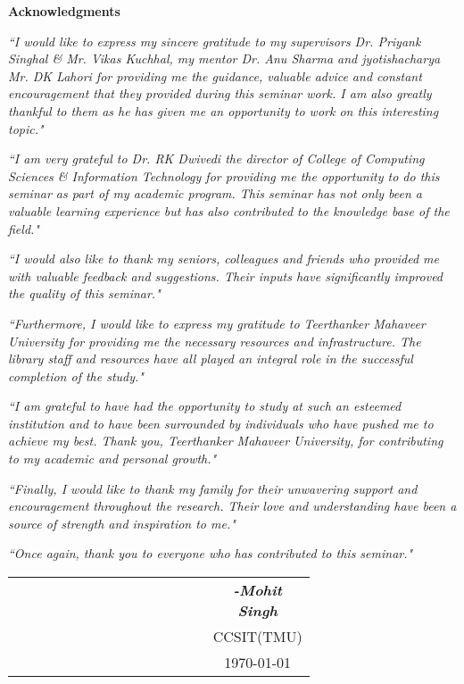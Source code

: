 \begin{center}
	\LARGE \textbf{Acknowledgments}
	\vspace{1\baselineskip}
\end{center}

\textit{``I would like to express my sincere gratitude to my supervisors Dr. Priyank Singhal \& Mr. Vikas Kuchhal, my mentor Dr. Anu Sharma and jyotishacharya Mr. DK Lahori for providing me the guidance, valuable advice and constant encouragement that they provided during this seminar work. I am also greatly thankful to them as he has given me an opportunity to work on this interesting topic."}

\textit{``I am very grateful to Dr. RK Dwivedi the director of College of Computing Sciences \& Information Technology for providing me the opportunity to do this seminar as part of my academic program. This seminar has not only been a valuable learning experience but has also contributed to the knowledge base of the field."}

\textit{``I would also like to thank my seniors, colleagues and friends who provided me with valuable feedback and suggestions. Their inputs have significantly improved the quality of this seminar."}

\textit{``Furthermore, I would like to express my gratitude to Teerthanker Mahaveer University for providing me the necessary resources and infrastructure. The library staff and resources have all played an integral role in the successful completion of the study."}

\textit{``I am grateful to have had the opportunity to study at such an esteemed institution and to have been surrounded by individuals who have pushed me to achieve my best. Thank you, Teerthanker Mahaveer University, for contributing to my academic and personal growth."}

\textit{``Finally, I would like to thank my family for their unwavering support and encouragement throughout the research. Their love and understanding have been a source of strength and inspiration to me."}

\textit{``Once again, thank you to everyone who has contributed to this seminar."}

\vspace{2\baselineskip}

\begin{center}
	\begin{tabular}{p{0.67\linewidth}c}
		&  \textbf{\textit{-Mohit Singh}} \\
		&  CCSIT(TMU) \\
		& \today
	\end{tabular}
\end{center}
\clearpage